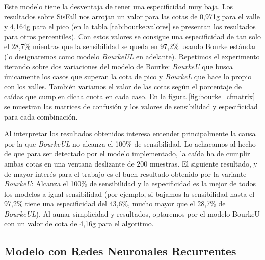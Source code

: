 Este modelo tiene la desventaja de tener una especificidad muy baja. Los resultados sobre SisFall nos arrojan un valor para las cotas de 0,971g para el valle y 4,164g para el pico (en la tabla \ref{tab:bourke:valores} se presentan los resultados para otros percentiles). Con estos valores se consigue una especificidad de tan solo el 28,7\% mientras que la sensibilidad se queda en 97,2\% usando Bourke estándar (lo designaremos como modelo \textit{BourkeUL} en adelante). Repetimos el experimento iterando sobre dos variaciones del modelo de Bourke: \textit{BourkeU} que busca únicamente los casos que superan la cota de pico y \textit{BourkeL} que hace lo propio con los valles. También variamos el valor de las cotas según el porcentaje de caídas que cumplen dicha cuota en cada caso. En la figura \ref{fig:bourke_cfmatrix} se muestran las matrices de confusión y los valores de sensibilidad y especificidad para cada combinación.


Al interpretar los resultados obtenidos interesa entender principalmente la causa por la que \textit{BourkeUL} no alcanza el 100\% de sensibilidad. Lo achacamos al hecho de que para ser detectado por el modelo implementado, la caída ha de cumplir ambas cotas en una ventana deslizante de 200 muestras. El siguiente resultado, y de mayor interés para el trabajo es el buen resultado obtenido por la variante \textit{BourkeU}: Alcanza el 100\% de sensibilidad y la especificidad es la mejor de todos los modelos a igual sensibilidad (por ejemplo, si bajamos la sensibilidad hasta el 97,2\% tiene una especificidad del 43,6\%, mucho mayor que el 28,7\% de \textit{BourkeUL}). Al aunar simplicidad y resultados, optaremos por el modelo BourkeU con un valor de cota de 4,16g para el algoritmo. 



\subsection{Modelo con Redes Neuronales Recurrentes}\label{sub:imp:model:rnn}

